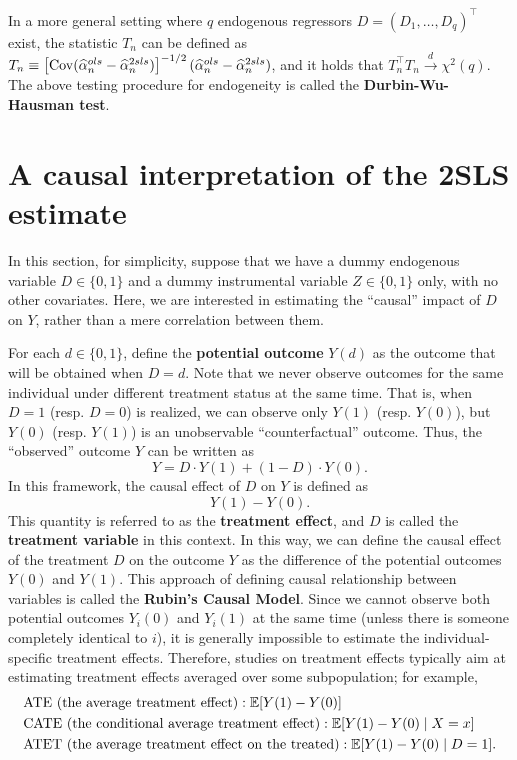 \documentclass[11pt, A4paper, openany, uplatex]{book}
\begin{document}
In a more general setting where $q$ endogenous regressors $D = (D_1, \ldots, D_q)^\top$ exist, the statistic $T_n$ can be defined as $T_n \equiv \left[\mathrm{Cov}(\widehat \alpha_n^{ols} - \widehat \alpha_n^{2sls})\right]^{-1/2}(\widehat \alpha_n^{ols} - \widehat \alpha_n^{2sls})$, and it holds that $T_n^\top T_n \overset{d}{\to} \chi^2(q)$.
The above testing procedure for endogeneity is called the \textbf{Durbin-Wu-Hausman test}.

 
\section{A causal interpretation of the 2SLS estimate}

In this section, for simplicity, suppose that we have a dummy endogenous variable $D \in \{0,1\}$ and a dummy instrumental variable $Z \in \{0,1\}$ only, with no other covariates.
Here, we are interested in estimating the ``causal'' impact of $D$ on $Y$, rather than a mere correlation between them.

For each $d \in \{0,1\}$, define the \textbf{potential outcome} $Y(d)$ as the outcome that will be obtained when $D = d$.
Note that we never observe outcomes for the same individual under different treatment status at the same time.
That is, when $D = 1$ (resp. $D = 0$) is realized, we can observe only $Y(1)$ (resp. $Y(0)$), but $Y(0)$ (resp. $Y(1)$) is an unobservable ``counterfactual'' outcome.
Thus, the ``observed'' outcome $Y$ can be written as
\[
	Y = D \cdot Y(1) + (1 - D) \cdot Y(0).
\]
In this framework, the causal effect of $D$ on $Y$ is defined as
\[
	Y(1) - Y(0).
\]
This quantity is referred to as the \textbf{treatment effect}, and $D$ is called the \textbf{treatment variable} in this context.
In this way, we can define the causal effect of the treatment $D$ on the outcome $Y$ as the difference of the potential outcomes $Y(0)$ and $Y(1)$.
This approach of defining causal relationship between variables is called the \textbf{Rubin's Causal Model}.
Since we cannot observe both potential outcomes $Y_i(0)$ and $Y_i(1)$ at the same time (unless there is someone completely identical to $i$), it is generally impossible to estimate the individual-specific treatment effects.
Therefore, studies on treatment effects typically aim at estimating treatment effects averaged over some subpopulation; for example, 
\begin{align*}
	&\text{ATE (the average treatment effect)}: \mathbb{E}[Y(1) - Y(0)]\\
	&\text{CATE (the conditional average treatment effect)}: \mathbb{E}[Y(1) - Y(0) \mid X = x] \\
	&\text{ATET (the average treatment effect on the treated)}: \mathbb{E}[Y(1) - Y(0) \mid D = 1].
\end{align*}
\end{document}
